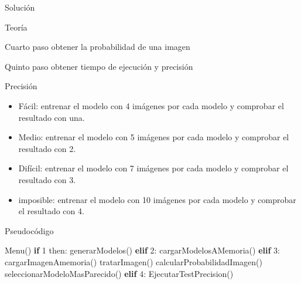 \documentclass[
  spanish,
  ignorenonframetext,
]{beamer}
\newenvironment{Shaded}{}{}
\newcommand{\ControlFlowTok}[1]{\textcolor[rgb]{0.00,0.44,0.13}{\textbf{#1}}}
\newcommand{\DecValTok}[1]{\textcolor[rgb]{0.25,0.63,0.44}{#1}}
\newcommand{\NormalTok}[1]{#1}
\providecommand{\tightlist}{%
  \setlength{\itemsep}{0pt}\setlength{\parskip}{0pt}}
\begin{document}
\begin{frame}[fragile]{Solución}
\begin{block}{Teoría}
\begin{block}{Cuarto paso obtener la probabilidad de una imagen}
\begin{block}{Quinto paso obtener tiempo de ejecución y precisión}
\begin{block}{Precisión}
\begin{itemize}
\tightlist
\item
  Fácil: entrenar el modelo con 4 imágenes por cada modelo y comprobar
  el resultado con una.
\item
  Medio: entrenar el modelo con 5 imágenes por cada modelo y comprobar
  el resultado con 2.
\item
  Difícil: entrenar el modelo con 7 imágenes por cada modelo y comprobar
  el resultado con 3.
\item
  imposible: entrenar el modelo con 10 imágenes por cada modelo y
  comprobar el resultado con 4.
\end{itemize}
\end{block}
\end{block}
\end{block}
\end{block}

\begin{block}{Pseudocódigo}
\protect\hypertarget{pseudocuxf3digo}{}
\begin{Shaded}
\begin{Highlighting}[]
\NormalTok{Menu()}
    \ControlFlowTok{if} \DecValTok{1}\NormalTok{ then:}
\NormalTok{        generarModelos()}
    \ControlFlowTok{elif} \DecValTok{2}\NormalTok{:}
\NormalTok{        cargarModelosAMemoria()}
    \ControlFlowTok{elif} \DecValTok{3}\NormalTok{:}
\NormalTok{        cargarImagenAmemoria()}
\NormalTok{        tratarImagen()}
\NormalTok{        calcularProbabilidadImagen()}
\NormalTok{        seleccionarModeloMasParecido()}
   \ControlFlowTok{elif} \DecValTok{4}\NormalTok{:}
\NormalTok{        EjecutarTestPrecision()}
\end{Highlighting}
\end{Shaded}
\end{block}
\end{frame}
\end{document}
